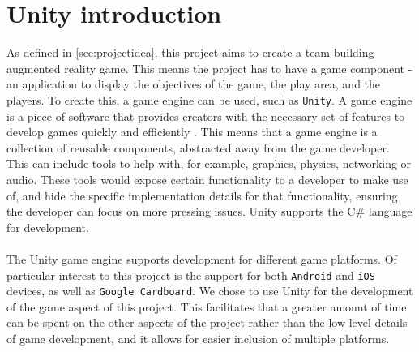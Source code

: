 \section{Unity introduction}\label{sec:unity-intro}
As defined in \autoref{sec:projectidea}, this project aims to create a team-building augmented reality game.
This means the project has to have a game component - an application to display the objectives of the game, the play area, and the players.
To create this, a game engine can be used, such as \texttt{Unity}.
A game engine is a piece of software that provides creators with the necessary set of features to develop games quickly and efficiently \cite{gameengine}.
This means that a game engine is a collection of reusable components, abstracted away from the game developer.
This can include tools to help with, for example, graphics, physics, networking or audio.
These tools would expose certain functionality to a developer to make use of, and hide the specific implementation details for that functionality, ensuring the developer can focus on more pressing issues.
Unity supports the C\# language for development\cite{unitylanguage}.
\\\\
The Unity game engine supports development for different game platforms.
Of particular interest to this project is the support for both \texttt{Android} and \texttt{iOS} devices, as well as \texttt{Google Cardboard}\cite{unityplatforms}.
We chose to use Unity for the development of the game aspect of this project.
This facilitates that a greater amount of time can be spent on the other aspects of the project rather than the low-level details of game development, and it allows for easier inclusion of multiple platforms.

